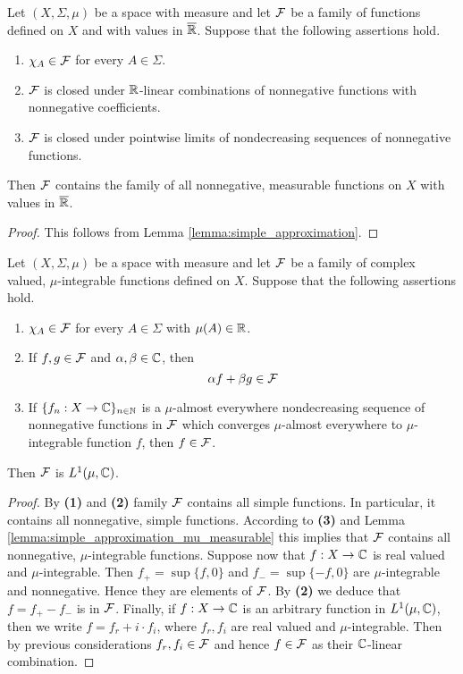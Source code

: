 \begin{corollary}\label{corollary:measurable_induction_for_nonnegative}
Let $(X,\Sigma,\mu)$ be a space with measure and let ${\mathcal F}$ be a family of functions defined on $X$ and with values in $\overline{{\mathbb R}}$. Suppose that the following assertions hold.
\begin{enumerate}[label=\emph{\textbf{(\arabic*)}}, leftmargin=*]
\item $\chi_A\in {\mathcal F}$ for every $A\in \Sigma$.
\item ${\mathcal F}$ is closed under ${\mathbb R}$-linear combinations of nonnegative functions with nonnegative coefficients.
\item ${\mathcal F}$ is closed under pointwise limits of nondecreasing sequences of nonnegative functions.
\end{enumerate}
Then ${\mathcal F}$ contains the family of all nonnegative, measurable functions on $X$ with values in $\overline{{\mathbb R}}$.
\end{corollary}
\begin{proof}
This follows from Lemma \ref{lemma:simple_approximation}.
\end{proof}

\begin{corollary}\label{corollary:measurable_induction_for_complex}
Let $(X,\Sigma,\mu)$ be a space with measure and let ${\mathcal F}$ be a family of complex valued, $\mu$-integrable functions defined on $X$. Suppose that the following assertions hold.
\begin{enumerate}[label=\emph{\textbf{(\arabic*)}}, leftmargin=*]
\item $\chi_A\in {\mathcal F}$ for every $A\in \Sigma$ with $\mu(A)\in {\mathbb R}$.
\item If $f, g\in {\mathcal F}$ and $\alpha, \beta\in {\mathbb C}$, then
$$\alpha f + \beta g\in {\mathcal F}$$
\item If $\{f_n:X\rightarrow {\mathbb C}\}_{n\in {\mathbb N}}$ is a $\mu$-almost everywhere nondecreasing sequence of nonnegative functions in ${\mathcal F}$ which converges $\mu$-almost everywhere to $\mu$-integrable function $f$, then $f\in {\mathcal F}$.
\end{enumerate}
Then ${\mathcal F}$ is $L^1(\mu, {\mathbb C})$.
\end{corollary}
\begin{proof}
By \textbf{(1)} and \textbf{(2)} family ${\mathcal F}$ contains all simple functions. In particular, it contains all nonnegative, simple functions. According to \textbf{(3)} and Lemma \ref{lemma:simple_approximation_mu_measurable} this implies that ${\mathcal F}$ contains all nonnegative, $\mu$-integrable functions. Suppose now that $f:X\rightarrow {\mathbb C}$ is real valued and $\mu$-integrable. Then $f_+ = \sup \{f, 0\}$ and $f_- = \sup\{-f, 0\}$ are $\mu$-integrable and nonnegative. Hence they are elements of ${\mathcal F}$. By \textbf{(2)} we deduce that $f = f_+ - f_-$ is in ${\mathcal F}$. Finally, if $f:X\rightarrow {\mathbb C}$ is an arbitrary function in $L^1(\mu, {\mathbb C})$, then we write $f = f_r + i\cdot f_i$, where $f_r, f_i$ are real valued and $\mu$-integrable. Then by previous considerations $f_r,f_i\in {\mathcal F}$ and hence $f\in {\mathcal F}$ as their ${\mathbb C}$-linear combination.
\end{proof}


